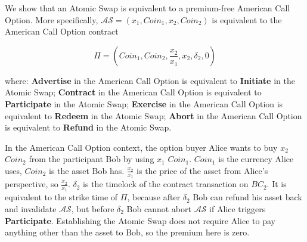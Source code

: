We show that an Atomic Swap is equivalent to a premium-free American Call Option.
More specifically, $\mathcal{AS} = (x_1, Coin_1, x_2, Coin_2)$ is equivalent to the American Call Option contract

$$
\Pi = (Coin_1, Coin_2, \frac{x_2}{x_1}, x_2, \delta_2, 0)
$$

where:
\textbf{Advertise} in the American Call Option is equivalent to \textbf{Initiate} in the Atomic Swap;
\textbf{Contract} in the American Call Option is equivalent to \textbf{Participate} in the Atomic Swap;
\textbf{Exercise} in the American Call Option is equivalent to \textbf{Redeem} in the Atomic Swap;
\textbf{Abort} in the American Call Option is equivalent to \textbf{Refund} in the Atomic Swap.


In the American Call Option context, the option buyer Alice wants to buy $x_2$ $Coin_2$ from the participant Bob by using $x_1$ $Coin_1$.
$Coin_1$ is the currency Alice uses, $Coin_2$ is the asset Bob has.
$\frac{x_2}{x_1}$ is the price of the asset from Alice's perspective, so $\frac{x_2}{x_1}$.
$\delta_2$ is the timelock of the contract transaction on $BC_2$.
It is equivalent to the strike time of $\Pi$, because after $\delta_2$ Bob can refund his asset back and invalidate $\mathcal{AS}$, but before $\delta_2$ Bob cannot abort $\mathcal{AS}$ if Alice triggers \textbf{Participate}.
Establishing the Atomic Swap does not require Alice to pay anything other than the asset to Bob, so the premium here is zero.